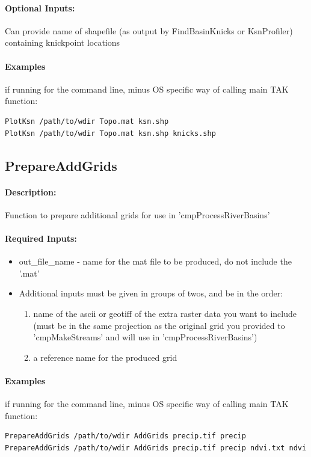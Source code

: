\paragraph{Optional Inputs:}
Can provide name of shapefile (as output by FindBasinKnicks or KsnProfiler) containing knickpoint locations 

\paragraph{Examples} if running for the command line, minus OS specific way of calling main TAK function:
\begin{lstlisting}[language=bash]
PlotKsn /path/to/wdir Topo.mat ksn.shp
PlotKsn /path/to/wdir Topo.mat ksn.shp knicks.shp
\end{lstlisting}

\subsection{PrepareAddGrids} \label{sec:PrepAdd}
\paragraph{Description:}
Function to prepare additional grids for use in 'cmpProcessRiverBasins'

\paragraph{Required Inputs:}
\begin{itemize}
\item out\_file\_name - name for the mat file to be produced, do not include the '.mat'

\item Additional inputs must be given in groups of twos, and be in the order: 
\begin{enumerate}
\item name of the ascii or geotiff of the extra raster data you want to include (must be in the same projection
as the original grid you provided to 'cmpMakeStreams' and will use in 'cmpProcessRiverBasins')
\item a reference name for the produced grid
\end{enumerate}
\end{itemize}

\paragraph{Examples} if running for the command line, minus OS specific way of calling main TAK function:
\begin{lstlisting}[language=bash]
PrepareAddGrids /path/to/wdir AddGrids precip.tif precip
PrepareAddGrids /path/to/wdir AddGrids precip.tif precip ndvi.txt ndvi  
\end{lstlisting}


